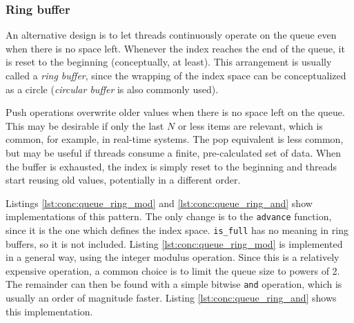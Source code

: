 \subsubsection{Ring buffer}

An alternative design is to let threads continuously operate on the queue even
when there is no space left.  Whenever the index reaches the end of the queue,
it is reset to the beginning (conceptually, at least).  This arrangement is
usually called a \textit{ring buffer}, since the wrapping of the index space can
be conceptualized as a circle (\textit{circular buffer} is also commonly used).

Push operations overwrite older values when there is no space left on the queue.
This may be desirable if only the last $N$ or less items are relevant, which is
common, for example, in real-time systems.  The pop equivalent is less common,
but may be useful if threads consume a finite, pre-calculated set of data.  When
the buffer is exhausted, the index is simply reset to the beginning and threads
start reusing old values, potentially in a different order.

Listings \ref{lst:conc:queue_ring_mod} and \ref{lst:conc:queue_ring_and} show
implementations of this pattern.  The only change is to the \texttt{advance}
function, since it is the one which defines the index space.  \texttt{is\_full}
has no meaning in ring buffers, so it is not included.  Listing
\ref{lst:conc:queue_ring_mod} is implemented in a general way, using the integer
modulus operation.  Since this is a relatively expensive operation, a common
choice is to limit the queue size to powers of 2.  The remainder can then be
found with a simple bitwise \texttt{and} operation, which is usually an order of
magnitude faster.  Listing \ref{lst:conc:queue_ring_and} shows this
implementation\footnotemark.


\begin{figure}[ht]
    \begin{subfigure}[t]{0.5\textwidth}
        
    \end{subfigure}
    \begin{subfigure}[t]{0.45\textwidth}
        
    \end{subfigure}
\end{figure}

